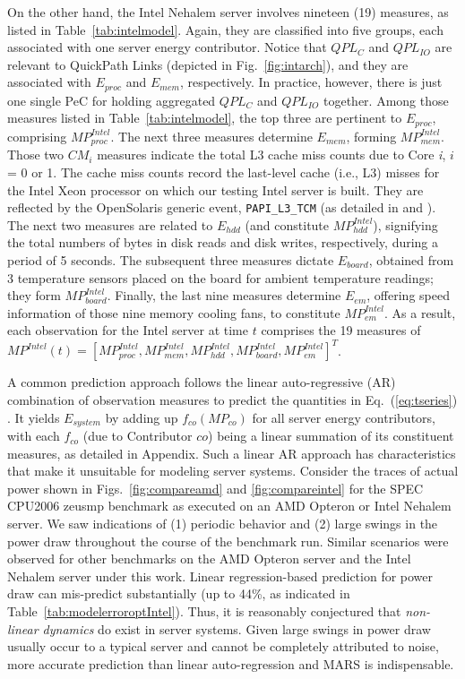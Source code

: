 \documentclass[prodmode,acmtaco,pdftex]{acmsmall}
\newcommand{\equationname}{Eq.}
\newcommand{\figurenames}{Figs.}
\newcommand{\figurename}{Fig.}
\begin{document}
On the other hand, the Intel Nehalem server involves nineteen (19)
measures, as listed in Table~\ref{tab:intelmodel}.  Again, they are
classified into five groups, each associated with one server energy
contributor.  Notice that $QPL_{C}$ and $QPL_{IO}$ are relevant to
QuickPath Links (depicted in \figurename~\ref{fig:intarch}), and they
are associated with $E_{proc}$ and $E_{mem}$, respectively.  In
practice, however, there is just one single PeC for holding aggregated
$QPL_{C}$ and $QPL_{IO}$ together.  Among those measures listed in
Table~\ref{tab:intelmodel}, the top three are pertinent to $E_{proc}$,
comprising $MP_{proc}^{Intel}$.  The next three measures determine
$E_{mem}$, forming $MP_{mem}^{Intel}$.  Those two $CM_{i}$ measures
indicate the total L3 cache miss counts due to Core \textit{i}, $i$ = 0
or 1.  The cache miss counts record the last-level cache (i.e., L3)
misses for the Intel Xeon processor on which our testing Intel server is
built.  They are reflected by the OpenSolaris generic event,
\texttt{PAPI\_L3\_TCM} (as detailed in \cite{Sun2008b} and
\cite{Intel2009}).  The next two measures are related to $E_{hdd}$ (and
constitute $MP_{hdd}^{Intel}$), signifying the total numbers of bytes in
disk reads and disk writes, respectively, during a period of 5 seconds.
The subsequent three measures dictate $E_{board}$, obtained from 3
temperature sensors placed on the board for ambient temperature
readings; they form $MP_{board}^{Intel}$.  Finally, the last nine
measures determine $E_{em}$, offering speed information of those nine
memory cooling fans, to constitute $MP_{em}^{Intel}$.  As a result, each
observation for the Intel server at time $t$ comprises the 19 measures
of $MP^{Intel}(t) =\left[MP_{proc}^{Intel}, MP_{mem}^{Intel},
  MP_{hdd}^{Intel}, MP_{board}^{Intel}, MP_{em}^{Intel}\right]^{T}$.

A common prediction approach follows the linear auto-regressive (AR)
combination of observation measures to predict the quantities in
\equationname~(\ref{eq:tseries})  \cite{Lewis2008}.
It yields $E_{system}$ by adding up $f_{co}(MP_{co})$ for all server energy
contributors, with each $f_{co}$ (due to Contributor $co$) being a
linear summation of its constituent measures, as detailed in Appendix.
Such a linear AR approach has characteristics that make it unsuitable
for modeling server systems.  Consider the traces of actual power shown
in \figurenames~\ref{fig:compareamd} and \ref{fig:compareintel} for the
SPEC CPU2006 zeusmp benchmark as executed on an AMD Opteron or Intel
Nehalem server.  We saw indications of (1) periodic behavior and (2)
large swings in the power draw throughout the course of the benchmark run.
Similar scenarios were observed for other benchmarks on 
the AMD Opteron server and the Intel Nehalem server under this work.
Linear regression-based prediction for power draw can
mis-predict substantially (up to 44\%, as indicated in
Table~\ref{tab:modelerroroptIntel}).  Thus, it is reasonably conjectured
that \textit{non-linear dynamics} do exist in server systems.  Given
large swings in power draw usually occur to a typical server and cannot
be completely attributed to noise, more accurate prediction than linear
auto-regression and MARS \cite{Friedman1991} is indispensable.
\end{document}
